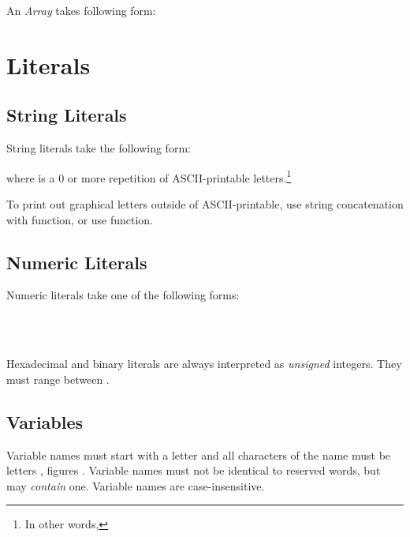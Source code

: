 An \emph{Array} takes following form:


\section{Literals}
\subsection{String Literals}

String literals take the following form:


where  is a 0 or more repetition of ASCII-printable letters.\footnote{In other words, }

To print out graphical letters outside of ASCII-printable, use string concatenation with  function, or use  function.

\subsection{Numeric Literals} 

Numeric literals take one of the following forms:

\\
\\

Hexadecimal and binary literals are always interpreted as \emph{unsigned} integers. They must range between \intrange{}.

\subsection{Variables} 

Variable names must start with a letter and all characters of the name must be letters , figures . Variable names must not be identical to reserved words, but may \emph{contain} one. Variable names are case-insensitive.


